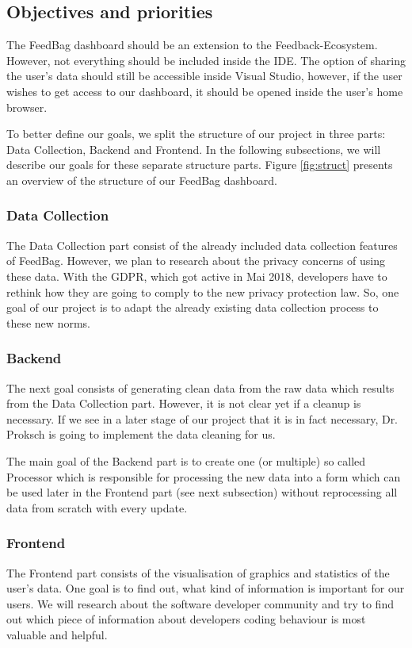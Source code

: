 \documentclass{seal_article}
\begin{document}
\subsection{Objectives and priorities}
The FeedBag dashboard should be an extension to the Feedback-Ecosystem. However, not everything should be included inside the IDE. The option of sharing the user’s data should still be accessible inside Visual Studio, however, if the user wishes to get access to our dashboard, it should be opened inside the user’s home browser.

To better define our goals, we split the structure of our project in three parts: Data Collection, Backend and Frontend. In the following subsections, we will describe our goals for these separate structure parts. Figure \ref{fig:struct} presents an overview of the structure of our FeedBag dashboard.

\subsubsection{Data Collection}
The Data Collection part consist of the already included data collection features of FeedBag. However, we plan to research about the privacy concerns of using these data. With the GDPR, which got active in Mai 2018, developers have to rethink how they are going to comply to the new privacy protection law. So, one goal of our project is to adapt the already existing data collection process to these new norms.

\subsubsection{Backend}
The next goal consists of generating clean data from the raw data which results from the Data Collection part. However, it is not clear yet if a cleanup is necessary. If we see in a later stage of our project that it is in fact necessary, Dr. Proksch is going to implement the data cleaning for us.

The main goal of the Backend part is to create one (or multiple) so called Processor which is responsible for processing the new data into a form which can be used later in the Frontend part (see next subsection) without reprocessing all data from scratch with every update.

\subsubsection{Frontend}
The Frontend part consists of the visualisation of graphics and statistics of the user’s data. One goal is to find out, what kind of information is important for our users. We will research about the software developer community and try to find out which piece of information about developers coding behaviour is most valuable and helpful.
\end{document}
